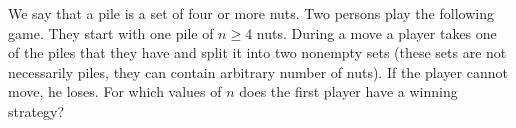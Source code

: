 We say that a pile is a set of four or more nuts. Two persons play the following game. They start with one pile of $n \geq 4$ nuts. During a move a player takes one of the piles that they have and split it into two nonempty sets (these sets are not necessarily piles, they can contain arbitrary number of nuts). If the player cannot move, he loses. For which values of $n$ does the first player have a winning strategy?